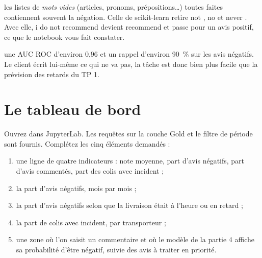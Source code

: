 \begin{attention}
les listes de \emph{mots vides} (articles, pronoms, prépositions\dots) toutes faites contiennent
souvent la négation. Celle de scikit-learn retire \og not \fg{}, \og no \fg{} et \og never \fg{}. Avec
elle, \og i do not recommend \fg{} devient \og recommend \fg{} et passe pour un avis positif, ce que le
notebook vous fait constater.
\end{attention}

\begin{resultat}
une AUC ROC d'environ 0,96 et un rappel d'environ 90~\% sur les avis négatifs. Le client écrit
lui-même ce qui ne va pas, la tâche est donc bien plus facile que la prévision des retards du TP 1.
\end{resultat}


\section{Le tableau de bord}\label{c4:sec:dashboard}

Ouvrez  dans JupyterLab. Les requêtes sur la couche Gold
et le filtre de période sont fournis. Complétez les cinq éléments demandés :

\begin{enumerate}[leftmargin=*,nosep]
  \item une ligne de quatre indicateurs : note moyenne, part d'avis négatifs, part d'avis commentés,
        part des colis avec incident ;
  \item la part d'avis négatifs, mois par mois ;
  \item la part d'avis négatifs selon que la livraison était à l'heure ou en retard ;
  \item la part de colis avec incident, par transporteur ;
  \item une zone où l'on saisit un commentaire et où le modèle de la partie 4 affiche sa probabilité
        d'être négatif, suivie des avis à traiter en priorité.
\end{enumerate}

